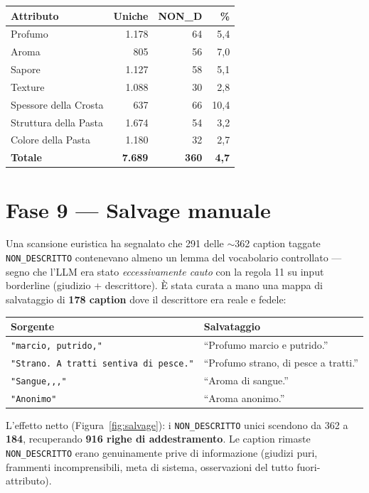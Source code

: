 \documentclass[11pt,a4paper]{article}
\begin{document}
\begin{center}\small
\begin{tabular}{@{}lrrr@{}}
\toprule
\textbf{Attributo} & \textbf{Uniche} & \textbf{NON\_D} & \textbf{\%} \\
\midrule
Profumo & 1.178 & 64 & 5,4 \\
Aroma & 805 & 56 & 7,0 \\
Sapore & 1.127 & 58 & 5,1 \\
Texture & 1.088 & 30 & 2,8 \\
Spessore della Crosta & 637 & 66 & 10,4 \\
Struttura della Pasta & 1.674 & 54 & 3,2 \\
Colore della Pasta & 1.180 & 32 & 2,7 \\
\midrule
\textbf{Totale} & \textbf{7.689} & \textbf{360} & \textbf{4,7} \\
\bottomrule
\end{tabular}
\end{center}

\section{Fase 9 --- Salvage manuale}

Una scansione euristica ha segnalato che 291 delle $\sim$362 caption taggate
\texttt{NON\_DESCRITTO} contenevano almeno un lemma del vocabolario
controllato --- segno che l'LLM era stato \emph{eccessivamente cauto} con la
regola 11 su input borderline (giudizio + descrittore). \`E stata curata a
mano una mappa di salvataggio di \textbf{178 caption} dove il descrittore era
reale e fedele:

\begin{center}\small
\begin{tabular}{@{}ll@{}}
\toprule
\textbf{Sorgente} & \textbf{Salvataggio} \\
\midrule
\texttt{"marcio, putrido,"} & ``Profumo marcio e putrido.'' \\
\texttt{"Strano. A tratti sentiva di pesce."} & ``Profumo strano, di pesce a tratti.'' \\
\texttt{"Sangue,,,"} & ``Aroma di sangue.'' \\
\texttt{"Anonimo"} & ``Aroma anonimo.'' \\
\bottomrule
\end{tabular}
\end{center}

L'effetto netto (Figura~\ref{fig:salvage}): i \texttt{NON\_DESCRITTO} unici
scendono da 362 a \textbf{184}, recuperando \textbf{916 righe di
addestramento}. Le caption rimaste \texttt{NON\_DESCRITTO} erano
genuinamente prive di informazione (giudizi puri, frammenti incomprensibili,
meta di sistema, osservazioni del tutto fuori-attributo).
\end{document}
